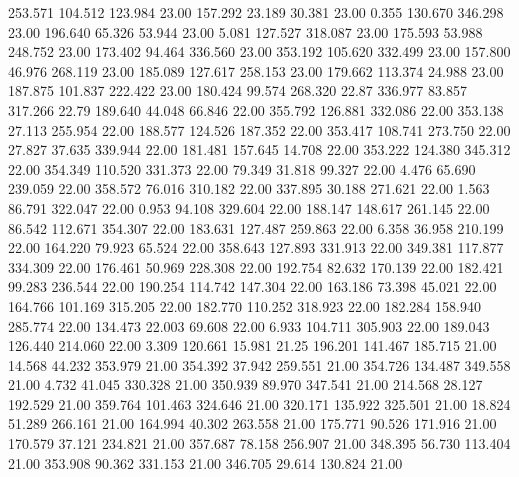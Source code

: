  253.571  104.512  123.984        23.00
 157.292   23.189   30.381        23.00
   0.355  130.670  346.298        23.00
 196.640   65.326   53.944        23.00
   5.081  127.527  318.087        23.00
 175.593   53.988  248.752        23.00
 173.402   94.464  336.560        23.00
 353.192  105.620  332.499        23.00
 157.800   46.976  268.119        23.00
 185.089  127.617  258.153        23.00
 179.662  113.374   24.988        23.00
 187.875  101.837  222.422        23.00
 180.424   99.574  268.320        22.87
 336.977   83.857  317.266        22.79
 189.640   44.048   66.846        22.00
 355.792  126.881  332.086        22.00
 353.138   27.113  255.954        22.00
 188.577  124.526  187.352        22.00
 353.417  108.741  273.750        22.00
  27.827   37.635  339.944        22.00
 181.481  157.645   14.708        22.00
 353.222  124.380  345.312        22.00
 354.349  110.520  331.373        22.00
  79.349   31.818   99.327        22.00
   4.476   65.690  239.059        22.00
 358.572   76.016  310.182        22.00
 337.895   30.188  271.621        22.00
   1.563   86.791  322.047        22.00
   0.953   94.108  329.604        22.00
 188.147  148.617  261.145        22.00
  86.542  112.671  354.307        22.00
 183.631  127.487  259.863        22.00
   6.358   36.958  210.199        22.00
 164.220   79.923   65.524        22.00
 358.643  127.893  331.913        22.00
 349.381  117.877  334.309        22.00
 176.461   50.969  228.308        22.00
 192.754   82.632  170.139        22.00
 182.421   99.283  236.544        22.00
 190.254  114.742  147.304        22.00
 163.186   73.398   45.021        22.00
 164.766  101.169  315.205        22.00
 182.770  110.252  318.923        22.00
 182.284  158.940  285.774        22.00
 134.473   22.003   69.608        22.00
   6.933  104.711  305.903        22.00
 189.043  126.440  214.060        22.00
   3.309  120.661   15.981        21.25
 196.201  141.467  185.715        21.00
  14.568   44.232  353.979        21.00
 354.392   37.942  259.551        21.00
 354.726  134.487  349.558        21.00
   4.732   41.045  330.328        21.00
 350.939   89.970  347.541        21.00
 214.568   28.127  192.529        21.00
 359.764  101.463  324.646        21.00
 320.171  135.922  325.501        21.00
  18.824   51.289  266.161        21.00
 164.994   40.302  263.558        21.00
 175.771   90.526  171.916        21.00
 170.579   37.121  234.821        21.00
 357.687   78.158  256.907        21.00
 348.395   56.730  113.404        21.00
 353.908   90.362  331.153        21.00
 346.705   29.614  130.824        21.00
